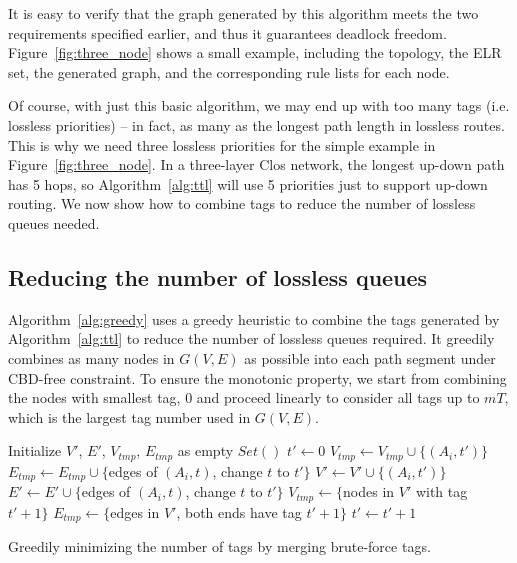 It is easy to verify that the graph generated by this algorithm meets the two
requirements specified earlier, and thus it guarantees deadlock freedom.
Figure~\ref{fig:three_node} shows a small example, including the topology, the
ELR set, the generated graph, and the corresponding rule
lists for each node.

Of course, with just this basic algorithm, we may end up with too many tags
(i.e. lossless priorities) -- in fact, as many as the longest path length in
lossless routes. This is why we need three lossless priorities for
the simple example in Figure~\ref{fig:three_node}. In a three-layer Clos
network, the longest up-down path has 5 hops, so Algorithm~\ref{alg:ttl} will use 5
priorities just to support up-down routing. We now show how to combine tags to
reduce the number of lossless queues needed.

\subsection{Reducing the number of lossless queues}

Algorithm~\ref{alg:greedy} uses a greedy heuristic to combine the tags generated
by Algorithm~\ref{alg:ttl} to reduce the number of lossless queues required.  It
greedily combines as many nodes in $G(V,E)$ as possible into each path segment
under CBD-free constraint. To ensure the monotonic property, we start
from combining the nodes with smallest tag, 0 and proceed linearly to consider
all tags up to $mT$, which is the largest tag number used in $G(V,E)$.

\begin{algorithm}[t]
	\small
	Initialize $V'$, $E'$, $V_{tmp}$, $E_{tmp}$ as empty $Set()$\;
	$t' \gets 0$\;
	 {
		 {
			$V_{tmp} \gets V_{tmp} \cup \{(A_i, t')\}$\;
			$E_{tmp} \gets E_{tmp} \cup \{$edges of $(A_i, t)$, change $t$ to $t'\}$\;
			 {
				$V' \gets V' \cup \{(A_i, t')\}$\;
				$E' \gets E' \cup \{$edges of $(A_i, t)$, change $t$ to $t'\}$\;
			}
		}
		 {
			$V_{tmp} \gets \{$nodes in $V'$ with tag $t'+1\}$\;
			$E_{tmp} \gets \{$edges in $V'$, both ends have tag $t'+1\}$\;
			$t' \gets t'+1$\;
		}
	}
	\;
    \caption{Greedily minimizing the number of tags by merging brute-force tags.}
	\label{alg:greedy}
\end{algorithm}

